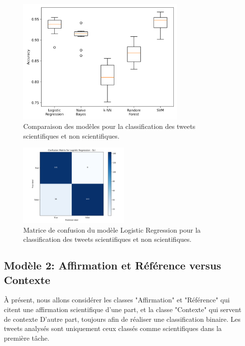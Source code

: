 \begin{figure}[H]
    \centering
    \includegraphics[width=0.75\textwidth]{images/model_comparison_1}
    \caption{Comparaison des modèles pour la classification des tweets scientifiques et non scientifiques.}
    \label{fig:model_comparison_sci_nsci}
\end{figure}

\begin{figure}[H]
    \centering
    \includegraphics[width=0.49\textwidth]{images/confusion_1.json-Logistic Regression_Sci_confusion_matrix}
    \caption{Matrice de confusion du modèle Logistic Regression pour la classification des tweets scientifiques et non scientifiques.}
    \label{fig:confusion_1.json-logistic-regression_sci_confusion_matrix}
\end{figure}

\subsection{Modèle 2: Affirmation et Référence versus Contexte}\label{subsec:modele-2:-claim-et-ref-vs-contexte}
À présent, nous allons considérer les classes "Affirmation" et "Référence" qui citent une affirmation scientifique d’une part, et la classe "Contexte" qui servent de contexte
D’autre part, toujours afin de réaliser une classification binaire.
Les tweets analysés sont uniquement ceux classés comme scientifiques dans la première tâche.

